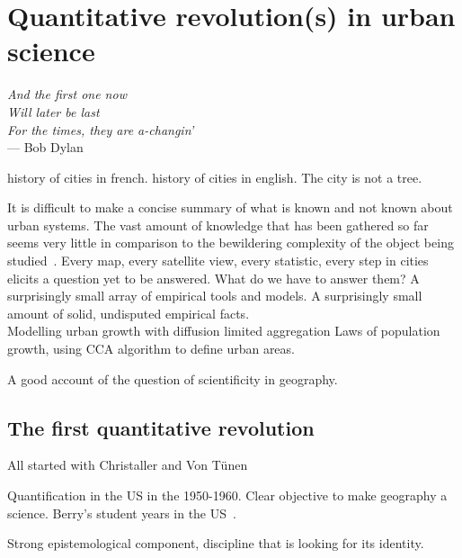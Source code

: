 

\chapter{Quantitative revolution(s) in urban science}
\label{chap:quantitative_revolutions}

\begin{flushright}{\slshape    
And the first one now\\
Will later be last\\
For the times, they are a-changin'} \\ \medskip
--- Bob Dylan 
\end{flushright}


\bigskip


\cite{Bairoch:1985} history of cities in french.
\cite{Mumford:1961} history of cities in english.
\cite{Alexander:1965} The city is not a tree.


It is difficult to make a concise summary of what is known and not known about
urban systems. The vast amount of knowledge that has been gathered so far seems
very little in comparison to the bewildering complexity of the object being
studied~\cite{Batty:2008}. Every map, every satellite view, every statistic, every step
in cities elicits a question yet to be answered. What do we have to answer them?
A surprisingly small array of empirical tools and models. A surprisingly small
amount of solid, undisputed empirical facts.\\

\cite{Makse:1995} Modelling urban growth with diffusion limited aggregation
\cite{Rozenfeld:2008} Laws of population growth, using CCA algorithm to define
urban areas.

\cite{Sanders:2011} A good account of the question of scientificity in
geography.

\section{The first quantitative revolution}
\label{sec:the_first_quantitative_revolution}

All started with Christaller and Von T\"unen

Quantification in the US in the 1950-1960. Clear objective to make geography a
science. Berry's student years in the US~\cite{Berry:1993}. 

Strong epistemological component, discipline that is looking for its identity.

